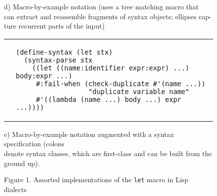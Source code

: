 \documentclass[10pt,journal,a4paper]{IEEEtran}
\begin{document}
\begin{figure*}[t]
\begin{listing}
\begin{adjustwidth}{4cm}{0pt}
d) Macro-by-example notation \cite{kohlbecker87} (uses a tree matching macro that\\
can extract and reassemble fragments of syntax objects; ellipses cap-\\ture
recurrent parts of the input)
\end{adjustwidth}

\begin{tabular}{p{2.5cm} p{14.5cm}}\\
 &
\begin{verbatim}
(define-syntax (let stx)
  (syntax-parse stx
    ((let ((name:identifier expr:expr) ...) body:expr ...)
     #:fail-when (check-duplicate #'(name ...))
                  "duplicate variable name"
     #'((lambda (name ...) body ...) expr ...))))
\end{verbatim}
\end{tabular}

\begin{adjustwidth}{3.2cm}{0pt}
e) Macro-by-example notation augmented with a syntax specification \cite{culpepper10}
(colons \\denote syntax classes, which are first-class and can be built from the ground up).
\end{adjustwidth}
\end{listing}
\end{figure*}

\begin{figure*}
\hskip3.95cm
\normalsize Figure 1. Assorted implementations of the \small \texttt{let} \normalsize macro in Lisp dialects
\end{figure*}
\end{document}
